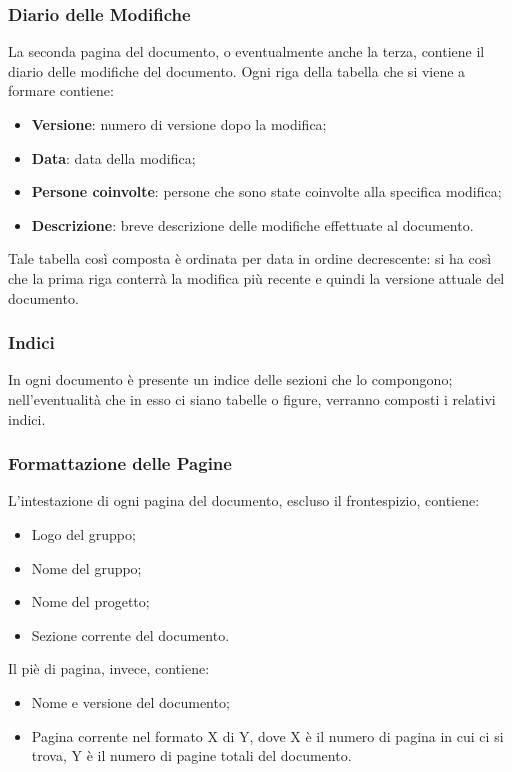 \subsubsection{Diario delle Modifiche}
La seconda pagina del documento, o eventualmente anche la terza, contiene il diario delle modifiche del documento. Ogni riga della tabella che si viene a formare contiene:
\begin{itemize}
\item \textbf{Versione}: numero di versione dopo la modifica; 
\item \textbf{Data}: data della modifica;
\item \textbf{Persone coinvolte}: persone che sono state coinvolte alla specifica modifica;
\item \textbf{Descrizione}: breve descrizione delle modifiche effettuate al documento.
\end{itemize}

Tale tabella così composta è ordinata per data in ordine decrescente: si ha così che la prima riga conterrà la modifica più recente e quindi la versione attuale del documento.

\subsubsection{Indici}
In ogni documento è presente un indice delle sezioni che lo compongono; nell'eventualità che in esso ci siano tabelle o figure, verranno composti i relativi indici.

\subsubsection{Formattazione delle Pagine}
L'intestazione di ogni pagina del documento, escluso il frontespizio, contiene:
\begin{itemize}
\item Logo del gruppo;
\item Nome del gruppo;
\item Nome del progetto;
\item Sezione corrente del documento.
\end{itemize}

Il piè di pagina, invece, contiene:
\begin{itemize}
\item Nome e versione del documento;
\item Pagina corrente nel formato X di Y, dove X è il numero di pagina in cui ci si trova, Y è il numero di pagine totali del documento.
\end{itemize}

